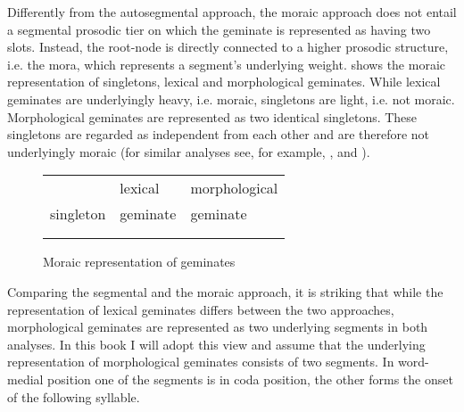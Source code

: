 Differently from the autosegmental approach, the moraic approach does not entail a segmental prosodic tier on which the geminate is represented as having two slots. Instead, the root-node is directly connected to a higher prosodic structure, i.e. the mora, which represents a segment's underlying weight.  shows the moraic representation of singletons, lexical and morphological geminates. While lexical geminates are underlyingly heavy, i.e. moraic, singletons are light, i.e. not moraic. Morphological geminates are represented as two identical singletons. These singletons are regarded as independent from each other and are therefore not underlyingly moraic  (for similar analyses see, for example,  \citealt[14]{Ham.2001}, \citealt[17]{Davis.2014} and \citealt{Davis.2017}).


\begin{figure} [h]
	\centering
	
	
	\begin{tabularx}{.8\linewidth}{YYY}
		
		&		lexical			 & 		 morphological \\
		
		singleton	&			  geminate	 & 			  geminate\\		
		\\
		\begin{tikzpicture}
		\Tree [.C  ] 					
		\end{tikzpicture}												&
		
		
		\begin{tikzpicture}[grow'=up]
		\Tree  [.C $\mu$ ]
		\end{tikzpicture}			
		&
		
		\begin{tikzpicture}[grow'=up]
		\Tree  [.C ]
		\end{tikzpicture}
		\begin{tikzpicture}[grow'=up]
		\Tree  [.C  ]
		\end{tikzpicture}		
		
	\end{tabularx}
	
	\caption{Moraic representation of geminates} 
	\label{fig:Moraic representation of geminates}
\end{figure}


Comparing the segmental and the moraic approach, it is striking that while the representation of lexical geminates differs between the two approaches, morphological geminates are represented as two underlying segments in both analyses.
In this book I will adopt this view and assume that the underlying representation of morphological geminates consists of two segments. In word-medial position one of the segments is in coda position, the other forms the onset of the following syllable. 



